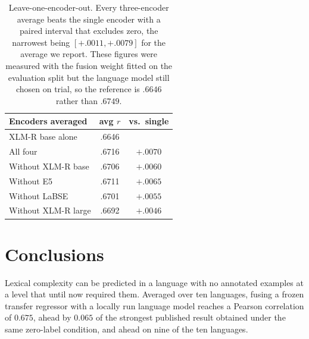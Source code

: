 \begin{table}[t]
\centering
\small
\begin{tabular}{lcc}
\toprule
Encoders averaged & avg $r$ & vs.\ single \\
\midrule
XLM-R base alone      & .6646 &  \\
All four              & .6716 & $+.0070$ \\
Without XLM-R base    & .6706 & $+.0060$ \\
Without E5            & .6711 & $+.0065$ \\
Without LaBSE         & .6701 & $+.0055$ \\
Without XLM-R large   & .6692 & $+.0046$ \\
\bottomrule
\end{tabular}
\caption{Leave-one-encoder-out. Every three-encoder average beats the
single encoder with a paired interval that excludes zero, the narrowest
being $[+.0011, +.0079]$ for the average we report. These figures were
measured with the fusion weight fitted on the evaluation split but the
language model still chosen on trial, so the reference is $.6646$ rather
than $.6749$.}
\label{tab:loeo}
\end{table}

\section{Conclusions}
\label{sec:conclusions}

Lexical complexity can be predicted in a language with no annotated
examples at a level that until now required them. Averaged over ten
languages, fusing a frozen transfer regressor with a locally run
language model reaches a Pearson correlation of $0.675$, ahead by
$0.065$ of the strongest published result obtained under the same
zero-label condition, and ahead on nine of the ten languages.

